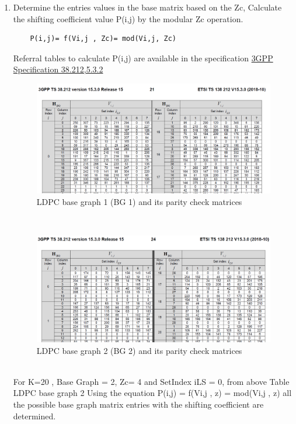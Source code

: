 \documentclass[journal,twocolumn]{IEEEtran}
\begin{document}
{{\begin{enumerate}
   \item      Determine the entries values in the base matrix based on the Zc,  Calculate the shifting coefficient value P(i,j) by the modular Zc operation. \\
   \begin{lstlisting}
    P(i,j)= f(Vi,j , Zc)= mod(Vi,j, Zc)
    \end{lstlisting}
    Referral tables to calculate P(i,j) are available in the specification {\href{https://www.etsi.org/deliver/etsi_ts/138200_138299/138212/17.01.00_60/ts_138212v170100p.pdf}{3GPP Specification 38.212,5.3.2 }}\\
  \begin{figure}[h]
 \includegraphics[width=\columnwidth]{../figs/hbgtab1.png}    
     \caption{LDPC base graph 1 (BG 1) and its parity check matrices}
  \end{figure}\\
  \vspace{14mm}
    \begin{figure}[h]
 \includegraphics[width=\columnwidth]{../figs/hbgtab2.png}    
     \caption{LDPC base graph 2 (BG 2) and its parity check matrices}
  \end{figure}\\
For K=20 , Base Graph = 2, Zc= 4 and SetIndex  iLS = 0, from above Table LDPC base graph 2 Using the equation P(i,j) = f(Vi,j , z) = mod(Vi,j , z) all the possible base graph matrix entries with the shifting coefficient are determined.   \\

\end{enumerate}}}
\end{document}
